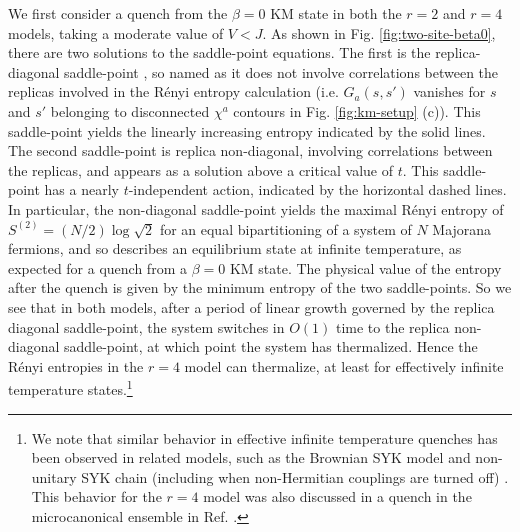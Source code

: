 \documentclass[reprint, floatfix,eqsecnum,superscriptaddress,preprint,nofootinbib,onecolumn,amsmath,amssymb,aps,prb]{revtex4-2}
\begin{document}
We first consider a quench from the $\beta=0$ KM state in both the $r=2$ and $r=4$ models, taking a moderate value of $V < J$. As shown in Fig. \ref{fig:two-site-beta0}, there are two solutions to the saddle-point equations. The first is the replica-diagonal saddle-point \cite{Penington2019,Chen2020}, so named as it does not involve correlations between the replicas involved in the R\'enyi entropy calculation (i.e. $G_a(s,s')$ vanishes for $s$ and $s'$ belonging to disconnected $\chi^a$ contours in Fig. \ref{fig:km-setup} (c)). 
This saddle-point yields the linearly increasing entropy indicated by the solid lines. The second saddle-point is replica non-diagonal, involving correlations between the replicas, and appears as a solution above a critical value of $t$. This saddle-point has a nearly $t$-independent action, indicated by the horizontal dashed lines. %
In particular, the non-diagonal saddle-point yields the maximal  R\'enyi entropy of $S^{(2)} = (N/2)\log\sqrt{2}$ for an equal bipartitioning of a system of $N$ Majorana fermions, and so describes an equilibrium state at infinite temperature, as expected for a quench from a $\beta=0$ KM state. 
The physical value of the entropy after the quench is given by the minimum entropy of the two saddle-points. So we see that in both models, after a period of linear growth governed by the replica diagonal saddle-point, the system switches in $O(1)$ time to the replica non-diagonal saddle-point, at which point the system has thermalized. 
Hence the R\'enyi entropies in the $r=4$ model can thermalize, at least for effectively infinite temperature states.\footnote{We note that similar behavior in effective infinite temperature quenches has been observed in related models, such as the Brownian SYK model \cite{Jian2021} and non-unitary SYK chain (including when non-Hermitian couplings are turned off) \cite{Liu2020}. This behavior for the $r=4$ model was also discussed in a quench in the microcanonical ensemble in Ref. \cite{Penington2019}. }

\end{document}
